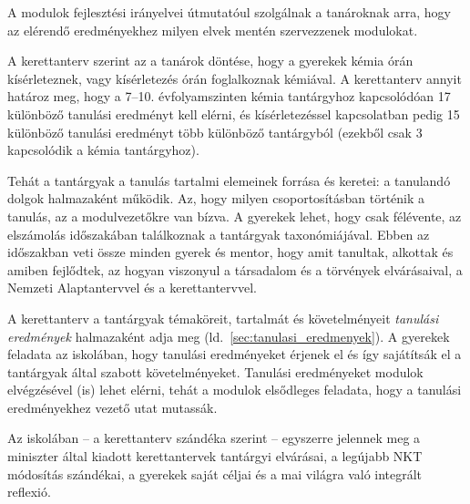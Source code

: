 A modulok fejlesztési irányelvei útmutatóul szolgálnak a tanároknak arra, hogy az elérendő eredményekhez milyen elvek mentén szervezzenek modulokat.


A kerettanterv szerint az a tanárok döntése, hogy a gyerekek kémia órán kísérleteznek, vagy kísérletezés órán foglalkoznak kémiával. A kerettanterv annyit határoz meg, hogy  a 7--10. évfolyamszinten kémia tantárgyhoz kapcsolódóan 17 különböző tanulási eredményt kell elérni, és kísérletezéssel kapcsolatban pedig 15 különböző tanulási eredményt több különböző tantárgyból (ezekből csak 3 kapcsolódik a kémia tantárgyhoz).

Tehát a tantárgyak a tanulás tartalmi elemeinek forrása és keretei: a tanulandó dolgok halmazaként működik. Az, hogy milyen csoportosításban történik a tanulás, az a modulvezetőkre van bízva. A gyerekek lehet, hogy csak félévente, az elszámolás időszakában találkoznak a tantárgyak taxonómiájával. Ebben az időszakban veti össze minden gyerek és mentor, hogy amit tanultak, alkottak és amiben fejlődtek, az hogyan viszonyul a társadalom és a törvények elvárásaival, a Nemzeti Alaptantervvel és a kerettantervvel.

A kerettanterv a tantárgyak témaköreit, tartalmát és követelményeit \emph{tanulási eredmények} halmazaként adja meg (ld.~\ref{sec:tanulasi_eredmenyek}). A gyerekek feladata az iskolában, hogy tanulási eredményeket érjenek el és így sajátítsák el a tantárgyak által szabott követelményeket. Tanulási eredményeket modulok elvégzésével (is) lehet elérni, tehát a modulok elsődleges feladata, hogy a tanulási eredményekhez vezető utat mutassák.

Az iskolában -- a kerettanterv szándéka szerint -- egyszerre jelennek meg a miniszter által kiadott kerettantervek tantárgyi elvárásai, a legújabb NKT módosítás szándékai, a gyerekek saját céljai és a mai világra való integrált reflexió. 